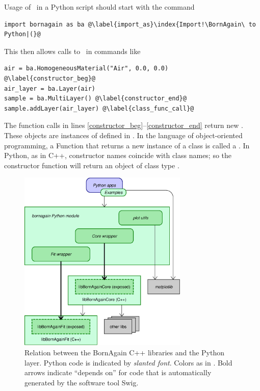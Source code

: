 Usage of \BornAgain\ in a Python script should start with the command
\setPy
\begin{lstlisting}
import bornagain as ba @\label{import_as}\index{Import!\BornAgain\ to Python|(}@
\end{lstlisting}
This then allows calls to \BornAgain\ in commands like
\pagebreak[2]
\setPyNum
\begin{lstlisting}
air = ba.HomogeneousMaterial("Air", 0.0, 0.0) @\label{constructor_beg}@
air_layer = ba.Layer(air)
sample = ba.MultiLayer() @\label{constructor_end}@
sample.addLayer(air_layer) @\label{class_func_call}@
\end{lstlisting}
The function calls in lines \ref{constructor_beg}--\ref{constructor_end}
return new .
These objects are instances of  defined in \BornAgain.
In the language of object-oriented programming,
a Function that returns a new instance of a class is called a .
In Python, as in C++, constructor names coincide with class names;
so the constructor function  will return an
object of class type .

\begin{figure}[tb]
\begin{center}
\includegraphics[width=0.72\textwidth]{fig/drawing/architecturePy.ps}
\end{center}
\caption{Relation between the BornAgain C++ libraries and the Python layer.
%
Python code is indicated by \textsl{slanted font}.
Colors as in .
Bold arrows indicate ``depends on'' for code that is automatically generated
by the software tool Swig.%
%
%
}
\label{FarchPy}
\end{figure}

